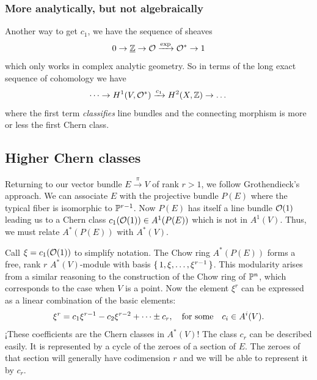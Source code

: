\documentclass[12pt]{memoir}
\begin{document}
\subsubsection{More analytically, but not algebraically}
Another way to get $c_1$, we have the sequence of sheaves 
$$0\to\underline{\mathbb{Z}}\to\mathcal{O}\xrightarrow{\exp}\mathcal{O}^\ast\to 1$$
which only works in complex analytic geometry. So in terms of the long exact sequence of cohomology we have 
$$\dots\to H^1(V,\mathcal{O}^\ast)\xrightarrow{c_1}H^2(X,\mathbb{Z})\to\dots$$
where the first term \emph{classifies} line bundles and the connecting morphism is more or less the first Chern class. 

\subsection{Higher Chern classes}

Returning to our vector bundle $E\xrightarrow{\pi}V$ of rank $r>1$, we follow Grothendieck's approach. We can associate $E$ with the projective bundle $P(E)$ where the typical fiber is isomorphic to $\mathbb{P}^{r-1}$. Now $P(E)$ has itself a line bundle $\mathcal{O}(1)$ leading us to a Chern class $c_1(\mathcal{O}(1))\in A^1(P(E))$ which is not in $A^1(V)$. Thus, we must relate $A^\ast(P(E))$ with $A^\ast(V)$.\par
Call $\xi=c_1(\mathcal{O}(1))$ to simplify notation. The Chow ring $A^\ast(P(E))$ forms a free, rank $r$ $A^\ast(V)$-module with basis $\{\,1,\xi,\dots,\xi^{r-1}\,\}$. This modularity arises from a similar reasoning to the construction of the Chow ring of $\mathbb{P}^n$, which corresponds to the case when $V$ is a point. Now the element $\xi^r$ can be expressed as a linear combination of the basic elements: 
$$\xi^r=c_1\xi^{r-1}-c_2\xi^{r-2}+\dots\pm c_r,\quad\text{for some}\quad c_i\in A^i(V).$$
¡These coefficients are the Chern classes in $A^\ast(V)$! The class $c_r$ can be described easily. It is represented by a cycle of the zeroes of a section of $E$. The zeroes of that section will generally have codimension $r$ and we will be able to represent it by $c_r$.
\ifx\nextra\undefined
\printindex
\else\fi
\nocite{*}


\end{document}

